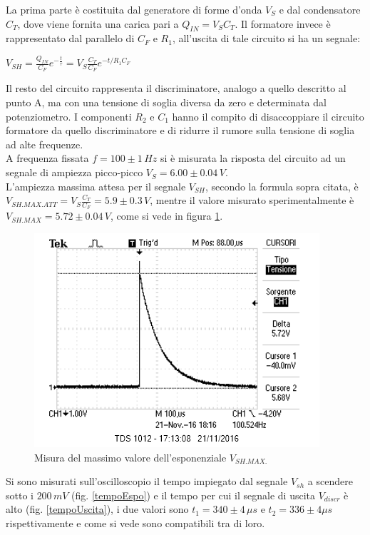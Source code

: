 \documentclass[10pt,a4paper]{article}
\begin{document}
La prima parte è costituita dal generatore di forme d'onda $V_S$ e dal condensatore $C_T$, dove viene fornita una carica pari a $Q_{IN}=V_S C_T$. Il formatore invece è rappresentato dal parallelo di $C_F$ e $R_1$, all'uscita di tale circuito si ha un segnale:\\
\begin{center}
$V_{SH}=\frac{Q_{IN}}{C_F} e^{-\frac{t}{\tau}} = V_S \frac{C_T}{C_F} e^{-t/R_1 C_F}$\\
\end{center}

Il resto del circuito rappresenta il discriminatore, analogo a quello descritto al punto A, ma con una tensione di soglia diversa da zero e determinata dal potenziometro. I componenti $R_2$ e $C_1$ hanno il compito di disaccoppiare il circuito formatore da quello discriminatore e di ridurre il rumore sulla tensione di soglia ad alte frequenze.\\
A frequenza fissata $f = 100\pm 1 \, Hz$ si è misurata la risposta del circuito ad un segnale di ampiezza picco-picco $V_S = 6.00 \pm 0.04 \, V$.\\
L'ampiezza massima attesa per il segnale $V_{SH}$, secondo la formula sopra citata, è $V_{SH.MAX.ATT} = V_S \frac{C_T}{C_F} =  5.9 \pm 0.3 \, V$, mentre il valore misurato sperimentalmente è $V_{SH.MAX} = 5.72 \pm 0.04 \, V$, come si vede in figura \ref{esponenziale}.\\

\begin{figure}[htb!]
\centering
\includegraphics[scale=1.0]{immagini/esponenziale.png}
\caption{Misura del massimo valore dell'esponenziale $V_{SH.MAX.}$}
\label{esponenziale}
\end{figure}

Si sono misurati sull'oscilloscopio il tempo impiegato dal segnale $V_{sh}$ a scendere sotto i  $200 \, mV$ (fig. \ref{tempoEspo}) e il tempo per cui il segnale di uscita $V_{discr}$ è alto (fig. \ref{tempoUscita}), i due valori sono $t_1 = 340 \pm 4 \, \mu s$ e  $t_2 = 336 \pm 4 \mu s$ rispettivamente e come si vede sono compatibili tra di loro.
\end{document}
